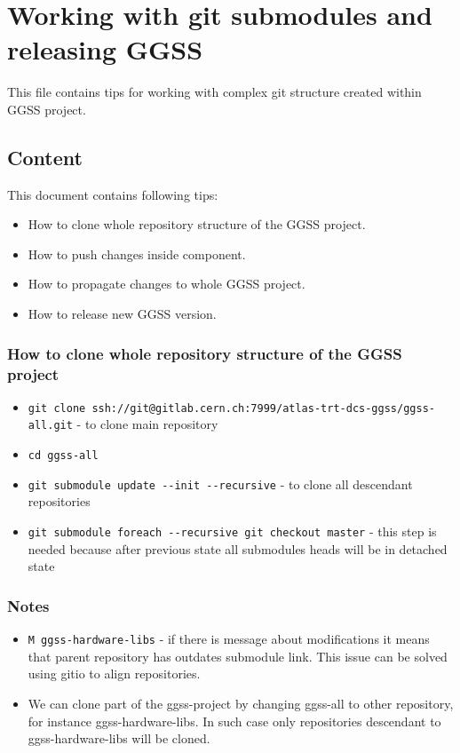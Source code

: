 \clearpage
\section{Working with git submodules and releasing GGSS}
\label{sec:working-with-git-sudmobules}
This file contains tips for working with complex git structure created within GGSS project.

\subsection*{Content}
This document contains following tips:
\begin{itemize}
    \item How to clone whole repository structure of the GGSS project.
    \item How to push changes inside component.
    \item How to propagate changes to whole GGSS project.
    \item How to release new GGSS version.
\end{itemize}

\subsubsection*{How to clone whole repository structure of the GGSS project}
\begin{itemize}
    \item \lstinline{git clone ssh://git@gitlab.cern.ch:7999/atlas-trt-dcs-ggss/ggss-all.git} - to clone main repository
    \item \lstinline{cd ggss-all}
    \item \lstinline{git submodule update --init --recursive} - to clone all descendant repositories
    \item \lstinline{git submodule foreach --recursive git checkout master} - this step is needed because after previous state all submodules heads will be in detached state
\end{itemize}

\subsubsection*{Notes}
\begin{itemize}
    \item \lstinline{M ggss-hardware-libs} - if there is message about modifications it means that parent repository has outdates submodule link. This issue can be solved using gitio to align repositories.
    \item We can clone part of the ggss-project by changing ggss-all to other repository, for instance ggss-hardware-libs. In such case only repositories descendant to ggss-hardware-libs will be cloned.
\end{itemize}

